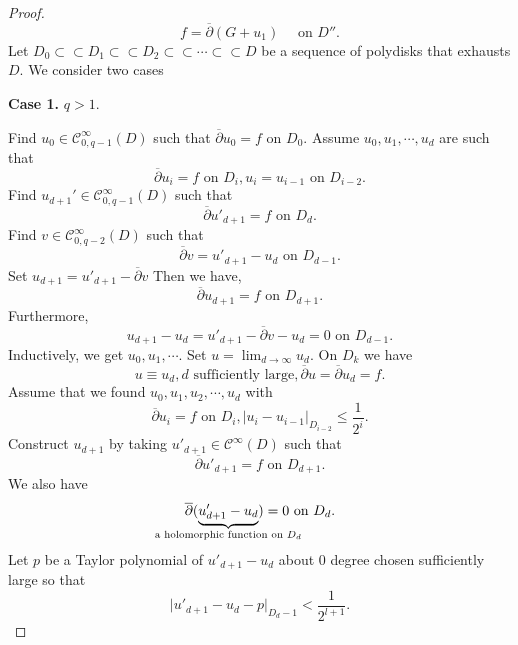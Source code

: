 \documentclass{article}
\newcommand{\compembed}[0]{\subset\subset}
\newcommand{\cpd}[0]{\overline{\partial}}
\newcommand{\on}[0]{\text{ on }}
\begin{document}
\begin{proof}
\begin{equation*}
    f = \overline{\partial}(G+u_1)\quad\text{ on $D''$}.
  \end{equation*}
  Let $D_0\compembed D_1\compembed D_2\compembed\cdots \compembed D$ be a sequence of polydisks that exhausts $D$. We consider two cases 
  \par \textbf{Case 1.} $q>1$.
  \par Find $u_0\in\mathcal{C}^\infty_{0,q-1}(D)$ such that $\overline{\partial}u_0 =f $ on $D_0$. Assume $u_0,u_1,\cdots,u_d$ are such that 
  \begin{equation*}
    \cpd u_i = f\text{ on $D_i$}, u_i = u_{i-1}\text{ on $D_{i-2}$}.
  \end{equation*}
Find $u_{d+1}'\in\mathcal{C}^\infty_{0,q-1}(D)$ such that 
\begin{equation*}
  \cpd u'_{d+1} = f\on D_d.
\end{equation*}
Find $v\in\mathcal{C}^\infty_{0,q-2}(D)$ such that 
\begin{equation*}
  \cpd v = u'_{d+1}-u_d\on D_{d-1}.
\end{equation*}
Set $u_{d+1} = u'_{d+1}-\cpd v$ Then we have,
\begin{equation*}
  \cpd u_{d+1} = f\on D_{d+1}.
\end{equation*}
Furthermore,
\begin{equation*}
  u_{d+1}-u_d = u'_{d+1}-\cpd v-u_d = 0\on D_{d-1}.
\end{equation*}
Inductively, we get $u_0,u_1,\cdots$. Set $u = \lim_{d\to\infty}u_d$. On $D_k$ we have 
\begin{equation*}
u \equiv u_d, \text{$d$ sufficiently large}, \cpd u = \cpd u_d = f.
\end{equation*}
Assume that we found $u_0,u_1,u_2,\cdots,u_d$ with 
\begin{equation*}
  \cpd u_i = f\on D_i, \vert u_i-u_{i-1}\vert_{D_{i-2}} \leq {\frac 1 {2^i}}.
\end{equation*}
Construct $u_{d+1}$ by taking $u'_{d+1}\in\mathcal{C}^\infty(D)$ such that 
\begin{equation*}
  \cpd u'_{d+1} = f\on D_{d+1}.
\end{equation*}
We also have 
\begin{equation*}
  \cpd(\underbrace{u'_{d+1}-u_d}_{\text{\makebox[0pt][c]{a holomorphic function on $D_d$}}}) = 0\on D_d.
\end{equation*}
Let $p$ be a Taylor polynomial of $u'_{d+1}-u_d$ about $0$ degree chosen sufficiently large so that 
\begin{equation*}
  \vert u'_{d+1}-u_d - p|_{D_d-1}<{\frac 1 {2^{l+1}}}.

\end{equation*}
\end{proof}
\end{document}
